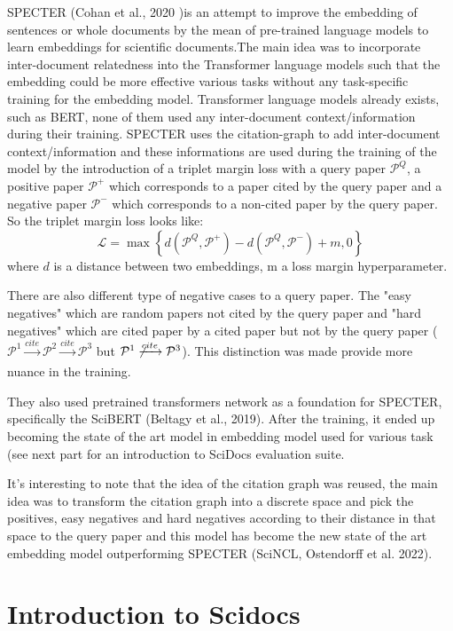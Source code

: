 \documentclass[conference]{IEEEtran}
\begin{document}
SPECTER (Cohan et al., 2020 \cite{b1})is an attempt to improve the embedding of sentences or whole documents by the mean of pre-trained language models to learn embeddings for scientific documents.The main idea was to incorporate inter-document relatedness into the Transformer language models such that the embedding could be more effective various tasks without any task-specific training for the embedding model. Transformer language models already exists, such as BERT, none of them used any inter-document context/information during their training. SPECTER uses the citation-graph to add inter-document context/information and these informations are used during the training of the model by the introduction of a triplet margin loss with a query paper $\mathcal P^Q$, a positive paper $\mathcal P^+$ which corresponds to a paper cited by the query paper and a negative paper $\mathcal P^-$ which corresponds to a non-cited paper by the query paper. So the triplet margin loss looks like: $$\mathcal L = \max\left\{d\left(\mathcal P^Q, \mathcal P^+\right) - d\left(\mathcal P^Q, \mathcal P^-\right) + m, 0\right\}$$ where $d$ is a distance between two embeddings, m a loss margin hyperparameter.

There are also different type of negative cases to a query paper. The "easy negatives" which are random papers not cited by the query paper and "hard negatives" which are cited paper by a cited paper but not by the query paper ($\mathcal P^1 \xrightarrow[]{cite} \mathcal P^2 \xrightarrow[]{cite}\mathcal P^3$ but $\mathcal P^1\not\xrightarrow[]{cite} \mathcal P^3$). This distinction was made provide more nuance in the training. 

They also used pretrained transformers network as a foundation for SPECTER, specifically the SciBERT (Beltagy et al., 2019\cite{b3}). After the training, it ended up becoming the state of the art model in embedding model used for various task (see next part for an introduction to SciDocs evaluation suite.

It's interesting to note that the idea of the citation graph was reused, the main idea was to transform the citation graph into a discrete space and pick the positives, easy negatives and hard negatives according to their distance in that space to the query paper and this model has become the new state of the art embedding model outperforming SPECTER (SciNCL, Ostendorff et al. 2022\cite{b2}).

\section{Introduction to Scidocs}
\end{document}
